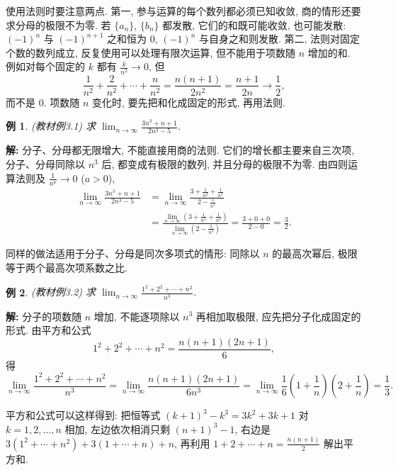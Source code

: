 \documentclass[UTF8,openany]{ctexbook}
\theoremstyle{chinesetextbook}
\newtheorem{example}{例}[section]
\newenvironment{cnsolution}{\par\indent\textbf{解:} \ignorespaces}{\par}
\begin{document}
使用法则时要注意两点. 第一, 参与运算的每个数列都必须已知收敛, 商的情形还要求分母的极限不为零. 若 $\{a_n\}$, $\{b_n\}$ 都发散, 它们的和既可能收敛, 也可能发散: $(-1)^n$ 与 $(-1)^{n+1}$ 之和恒为 $0$, $(-1)^n$ 与自身之和则发散. 第二, 法则对固定个数的数列成立, 反复使用可以处理有限次运算, 但不能用于项数随 $n$ 增加的和. 例如对每个固定的 $k$ 都有 $\displaystyle\frac k{n^2}\to0$, 但
\[
\frac1{n^2}+\frac2{n^2}+\cdots+\frac n{n^2}=\frac{n(n+1)}{2n^2}=\frac{n+1}{2n}\to\frac12,
\]
而不是 $0$. 项数随 $n$ 变化时, 要先把和化成固定的形式, 再用法则.
\begin{example}
\textnormal{(教材例3.1)} 求 $\displaystyle\lim_{n\to\infty}\frac{3n^3+n+1}{2n^3-5}$.
\end{example}
\begin{cnsolution}
分子、分母都无限增大, 不能直接用商的法则. 它们的增长都主要来自三次项, 分子、分母同除以 $n^3$ 后, 都变成有极限的数列, 并且分母的极限不为零. 由四则运算法则及 $\displaystyle\frac1{n^a}\to0$ ($a>0$),
\[
\begin{aligned}
\lim_{n\to\infty}\frac{3n^3+n+1}{2n^3-5}
&=\lim_{n\to\infty}\frac{3+\frac1{n^2}+\frac1{n^3}}{2-\frac5{n^3}}\\
&=\frac{\displaystyle\lim_{n\to\infty}\left(3+\frac1{n^2}+\frac1{n^3}\right)}{\displaystyle\lim_{n\to\infty}\left(2-\frac5{n^3}\right)}
=\frac{3+0+0}{2-0}=\frac32.
\end{aligned}
\]
\end{cnsolution}
同样的做法适用于分子、分母是同次多项式的情形: 同除以 $n$ 的最高次幂后, 极限等于两个最高次项系数之比.
\begin{example}
\textnormal{(教材例3.2)} 求 $\displaystyle\lim_{n\to\infty}\frac{1^2+2^2+\cdots+n^2}{n^3}$.
\end{example}
\begin{cnsolution}
分子的项数随 $n$ 增加, 不能逐项除以 $n^3$ 再相加取极限, 应先把分子化成固定的形式. 由平方和公式
\[
1^2+2^2+\cdots+n^2=\frac{n(n+1)(2n+1)}6,
\]
得
\[
\lim_{n\to\infty}\frac{1^2+2^2+\cdots+n^2}{n^3}
=\lim_{n\to\infty}\frac{n(n+1)(2n+1)}{6n^3}
=\lim_{n\to\infty}\frac16\left(1+\frac1n\right)\left(2+\frac1n\right)
=\frac13.
\]
\end{cnsolution}
平方和公式可以这样得到: 把恒等式 $(k+1)^3-k^3=3k^2+3k+1$ 对 $k=1,2,\ldots,n$ 相加, 左边依次相消只剩 $(n+1)^3-1$, 右边是 $3(1^2+\cdots+n^2)+3(1+\cdots+n)+n$, 再利用 $\displaystyle1+2+\cdots+n=\frac{n(n+1)}2$ 解出平方和.
\end{document}
